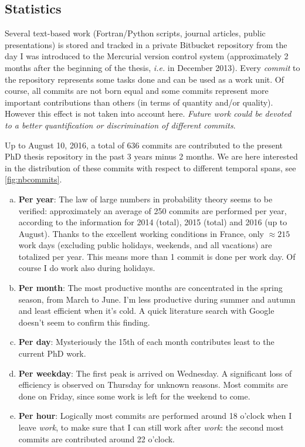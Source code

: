 \subsection*{Statistics}
Several text-based work (Fortran/Python scripts, journal articles, public presentations) is stored and tracked in a private Bitbucket repository from the day I was introduced to the Mercurial version control system (approximately 2 months after the beginning of the thesis, \emph{i.e.} in December 2013). Every \emph{commit} to the repository represents some tasks done and can be used as a work unit. Of course, all commits are not born equal and some commits represent more important contributions than others (in terms of quantity and/or quality). However this effect is not taken into account here. \emph{Future work could be devoted to a better quantification or discrimination of different commits}.

Up to August 10, 2016, a total of 636 commits are contributed to the present PhD thesis repository in the past 3 years minus 2 months. We are here interested in the distribution of these commits with respect to different temporal spans, see \cref{fig:nbcommits}.
\begin{enumerate}[(a)]
\item \textbf{Per year}: The law of large numbers in probability theory seems to be verified: approximately an average of 250 commits are performed per year, according to the information for 2014 (total), 2015 (total) and 2016 (up to August). Thanks to the excellent working conditions in France, only $\approx 215$ work days (excluding public holidays, weekends, and all vacations) are totalized per year. This means more than 1 commit is done per work day. Of course I do work also during holidays.

\item \textbf{Per month}: The most productive months are concentrated in the spring season, from March to June. I'm less productive during summer and autumn and least efficient when it's cold. A quick literature search with Google doesn't seem to confirm this finding.

\item \textbf{Per day}: Mysteriously the 15th of each month contributes least to the current PhD work.

\item \textbf{Per weekday}: The first peak is arrived on Wednesday. A significant loss of efficiency is observed on Thursday for unknown reasons. Most commits are done on Friday, since some work is left for the weekend to come.

\item \textbf{Per hour}: Logically most commits are performed around 18 o'clock when I leave \emph{work}, to make sure that I can still work after \emph{work}: the second most commits are contributed around 22 o'clock.
\end{enumerate}

